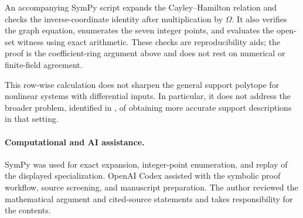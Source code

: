 \documentclass[11pt]{article}
\begin{document}
An accompanying SymPy script expands the Cayley--Hamilton relation and checks
the inverse-coordinate identity after multiplication by \(\Omega\).  It also
verifies the graph equation, enumerates the seven integer points, and
evaluates the open-set witness using exact arithmetic.  These checks are
reproducibility aids; the proof is the coefficient-ring argument above and
does not rest on numerical or finite-field agreement.

This row-wise calculation does not sharpen the general support polytope for
nonlinear systems with differential inputs.  In particular, it does not address
the broader problem, identified in \cite{JeronimoLanciano2026}, of obtaining
more accurate support descriptions in that setting.

\paragraph{Computational and AI assistance.}
SymPy was used for exact expansion, integer-point enumeration, and replay of
the displayed specialization.  OpenAI Codex assisted with the symbolic proof
workflow, source screening, and manuscript preparation.  The author reviewed
the mathematical argument and cited-source statements and takes
responsibility for the contents.



\end{document}
